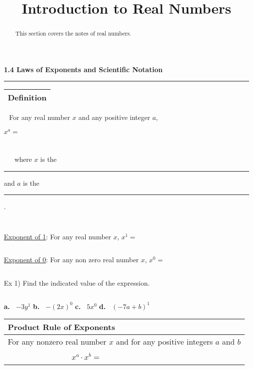 \documentclass{ximera}
\title{Introduction to Real Numbers}
\begin{document}
\begin{abstract}
This section covers the notes of real numbers. 
\end{abstract}

{\LARGE \textbf{1.4 Laws of Exponents and Scientific Notation}}

\noindent \rule{7.35in}{2pt}

\vspace{.2in}

\noindent \begin{tabular}{|c|} \hline Definition\\ \hline \end{tabular} $~~$ For any real number $x$ and any positive integer $a$,

\begin{center} {\LARGE $\displaystyle x^a=$} \end{center}

$~$

$~$

$~~~~~~~$where $x$ is the \rule{1in}{.5pt} and $a$ is the \rule{2in}{.5pt}.

$~$

$~$

\noindent \underline{Exponent of 1}: For any real number $x$, $x^1=$

$~$

\noindent \underline{Exponent of 0}: For any non zero real number $x$, $x^0=$

$~$

\noindent Ex 1) Find the indicated value of the expression.

$~$

\textbf{a.}$~~~~$$\displaystyle -3y^1$ \hspace{.75in} \textbf{b.}$~~~~$$\displaystyle -(2x)^0$ \hspace{.75in} \textbf{c.}$~~~~$$\displaystyle 5x^0$ \hspace{.75in} \textbf{d.}$~~~~$$\displaystyle (-7a+b)^1$

\vspace{1in}

\begin{center} \begin{tabular}{|l|}
\hline 
\textbf{Product Rule of Exponents}\\
\hline
For any nonzero real number $x$ and for any positive integers $a$ and $b$\\
$~$\\
$~~~~~~~~~~~~~~~~~~~~~~~~~~~~~~~~~~~~~${\Large$x^a\cdot x^b=~~~~$}\\
$~$\\
\hline
\end{tabular} \end{center}
\end{document}
